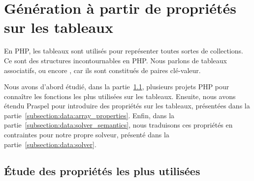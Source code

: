 \section{Génération à partir de propriétés sur les tableaux}
\label{section:data:arrays}

En PHP, les tableaux sont utilisés pour représenter toutes sortes de
collections. Ce sont des structures incontournables en PHP. Nous parlons de
tableaux associatifs, ou encore , car ils sont constitués de
paires clé-valeur.

Nous avons d'abord étudié, dans la partie~\ref{subsection:data:study}, plusieurs
projets PHP pour connaître les fonctions les plus utilisées sur les tableaux.
Ensuite, nous avons étendu Praspel pour introduire des propriétés sur les
tableaux, présentées dans la partie~\ref{subsection:data:array_properties}.
Enfin, dans la partie~\ref{subsection:data:solver_semantics}, nous traduisons
ces propriétés en contraintes pour notre propre solveur, présenté dans la
partie~\ref{subsection:data:solver}.

\subsection{Étude des propriétés les plus utilisées}
\label{subsection:data:study}

